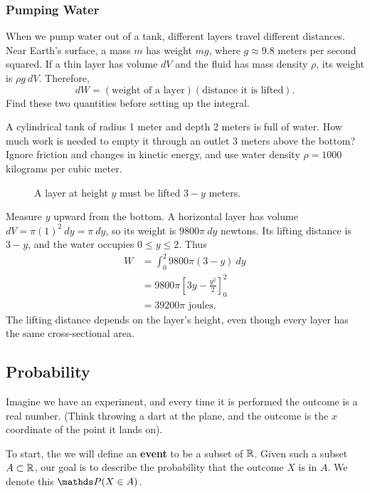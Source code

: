 \subsubsection{Pumping Water}

When we pump water out of a tank, different layers travel different
distances. Near Earth's surface, a mass $m$ has weight $mg$, where
$g\approx9.8$ meters per second squared. If a thin layer has volume
$dV$ and the fluid has mass density $\rho$, its weight is $\rho g\ dV$.
Therefore,
$$dW=(\text{weight of a layer})(\text{distance it is lifted}).$$
Find these two quantities before setting up the integral.

\begin{exampleblock}[breakable]
A cylindrical tank of radius 1 meter and depth 2 meters is full of
water. How much work is needed to empty it through an outlet 3 meters
above the bottom? Ignore friction and changes in kinetic energy, and
use water density $\rho=1000$ kilograms per cubic meter.

\begin{figure}[H]
\centering

\caption{A layer at height $y$ must be lifted $3-y$ meters.}
\label{fig:pumping-water}
\end{figure}

Measure $y$ upward from the bottom. A horizontal layer has volume
$dV=\pi(1)^2\ dy=\pi\ dy$, so its weight is $9800\pi\ dy$ newtons.
Its lifting distance is $3-y$, and the water occupies $0\leq y\leq2$.
Thus
$$\begin{aligned}
W&=\int_0^2 9800\pi(3-y)\ dy\\
 &=9800\pi\left[3y-\frac{y^2}{2}\right]_0^2\\
 &=39200\pi\text{ joules}.
\end{aligned}$$
The lifting distance depends on the layer's height, even though every
layer has the same cross-sectional area.
\end{exampleblock}

\subsection{Probability}

Imagine we have an experiment, and every time it is performed the outcome is a real number. (Think throwing a dart at the plane, and the outcome is the $x$ coordinate of the point it lands on).

To start, the we will define an \textbf{event} to be a subset of $\mathbb{R}$. Given such a subset $A\subset\mathbb{R}$, our goal is to describe the probability that the outcome $X$ is in $A$. We denote this $\P(X\in A)$.


